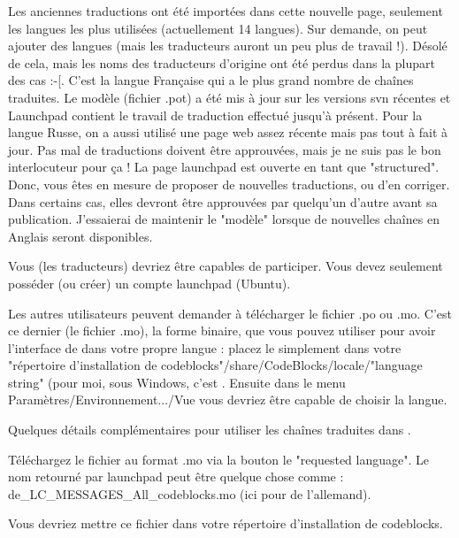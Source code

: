 Les anciennes traductions ont été importées dans cette nouvelle page, seulement les langues les plus utilisées (actuellement 14 langues). Sur demande, on peut ajouter des langues (mais les traducteurs auront un peu plus de travail !).\newline
Désolé de cela, mais les noms des traducteurs d'origine ont été perdus dans la plupart des cas  :-[. \newline
C'est la langue Française qui a le plus grand nombre de chaînes traduites. Le modèle (fichier .pot) a été mis à jour sur les versions svn récentes et Launchpad contient le travail de traduction effectué jusqu'à présent. Pour la langue Russe, on a aussi utilisé une page web assez récente mais pas tout à fait à jour. Pas mal de traductions doivent être approuvées, mais je ne suis pas le bon interlocuteur pour ça !\newline
La page launchpad est ouverte en tant que "structured". Donc, vous êtes en mesure de proposer de nouvelles traductions, ou d'en corriger. Dans certains cas, elles devront être approuvées par quelqu'un d'autre avant sa publication.\newline
J'essaierai de maintenir le "modèle" lorsque de nouvelles chaînes en Anglais seront disponibles.

Vous (les traducteurs) devriez être capables de participer. Vous devez seulement posséder (ou créer) un compte launchpad (Ubuntu).

Les autres utilisateurs peuvent demander à télécharger le fichier .po ou .mo. C'est ce dernier (le fichier .mo), la forme binaire, que vous pouvez utiliser pour avoir l'interface de \codeblocks dans votre propre langue : placez le simplement dans votre "répertoire d'installation de codeblocks"/share/CodeBlocks/locale/"language string" (pour moi, sous Windows, c'est\newline
 . Ensuite dans le menu Paramètres/Environnement.../Vue vous devriez être capable de choisir la langue.

Quelques détails complémentaires pour utiliser les chaînes traduites dans \codeblocks.

Téléchargez le fichier au format .mo via la bouton le "requested language". Le nom retourné par launchpad peut être quelque chose comme : de\_LC\_MESSAGES\_All\_codeblocks.mo (ici pour de l'allemand).

Vous devriez mettre ce fichier dans votre répertoire d'installation de codeblocks.

